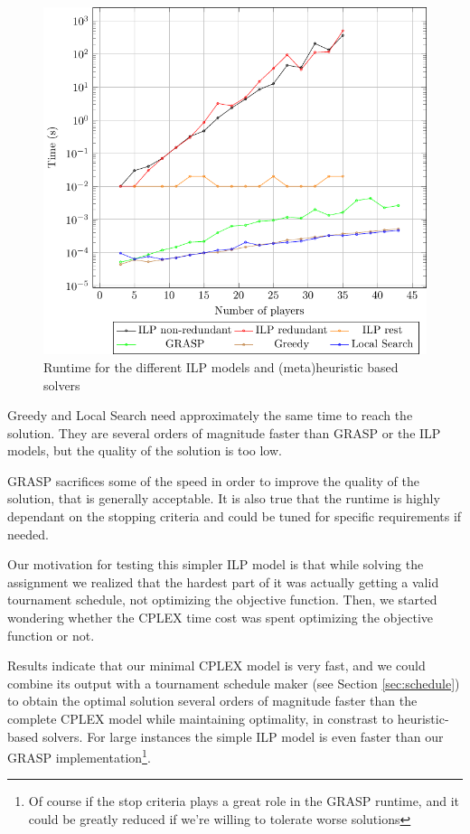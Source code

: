 \documentclass[a4paper, 10pt]{article}
\begin{document}
\begin{figure}[H]
    \centering
    \includegraphics[width=\linewidth]{plots/times.pdf}
    \caption{Runtime for the different ILP models and (meta)heuristic based solvers}
    \label{fig:time}
\end{figure}

Greedy and Local Search need approximately the same time to reach the solution. They are several orders of magnitude faster than GRASP or the ILP models, but the quality of the solution is too low.

GRASP sacrifices some of the speed in order to improve the quality of the solution, that is generally acceptable. It is also true that the runtime is highly dependant on the stopping criteria and could be tuned for specific requirements if needed.

Our motivation for testing this simpler ILP model is that while solving the assignment we realized that the hardest part of it was actually getting a valid tournament schedule, not optimizing the objective function. Then, we started wondering whether the CPLEX time cost was spent optimizing the objective function or not. 

Results indicate that our minimal CPLEX model is very fast, and we could combine its output with a tournament schedule maker (see Section \ref{sec:schedule}) to obtain the optimal solution several orders of magnitude faster than the complete CPLEX model while maintaining optimality, in constrast to heuristic-based solvers. For large instances the simple ILP model is even faster than our GRASP implementation\footnote{Of course if the stop criteria plays a great role in the GRASP runtime, and it could be greatly reduced if we're willing to tolerate worse solutions}.
\end{document}
